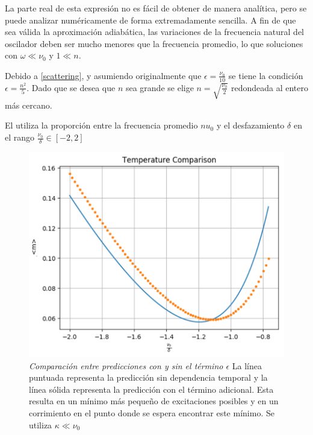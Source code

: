 \documentclass[10pt,a4paper]{report}
\begin{document}
La parte real de esta expresión no es fácil de obtener de manera
analítica, pero se puede analizar numéricamente de forma
extremadamente sencilla. A fin de que sea válida la aproximación
adiabática, las variaciones de la frecuencia natural del oscilador
deben ser mucho menores que la frecuencia promedio, lo que
 soluciones con $\omega \ll \nu_0$ y $1 \ll n$.

Debido a \ref{scattering}, y asumiendo originalmente que
$\epsilon = \frac{\nu_0}{10}$ se tiene la condición
$\epsilon = \frac{n^2}{5}$. Dado que se desea que $n$ sea grande se
elige $n=\sqrt{\frac{\nu_0}{2}}$ redondeada al entero más cercano.


El  utiliza la proporción entre la frecuencia promedio $nu_0$ y
el desfazamiento $\delta$ en el rango
$\frac{\nu_0}{\delta} \in [-2,2]$

\begin{figure}
\includegraphics[scale=.55]{GraficaTemp.pdf} 
\caption{\textit{Comparación entre predicciones con y sin el término $\epsilon$} La línea puntuada representa la predicción sin dependencia temporal y la línea sólida representa la predicción con el término adicional. Esta resulta en un mínimo más pequeño de excitaciones posibles y en un corrimiento en el punto donde se espera encontrar este mínimo. Se utiliza $\kappa \ll \nu_0$}
\end{figure}
\end{document}
